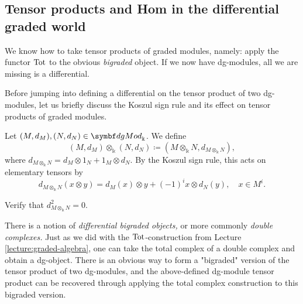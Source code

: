 \subsection{Tensor products and Hom in the differential graded world}
We know how to take tensor products of graded modules, namely: apply the functor \(\operatorname{Tot}\) to the obvious \emph{bigraded} object.
If we now have dg-modules, all we are missing is a differential.
\begin{remark}
	Before jumping into defining a differential on the tensor product of two dg-modules, let us briefly discuss the Koszul sign rule and its
	effect on tensor products of graded modules.
\end{remark}
\begin{definition}
	Let \((M,d_M),(N,d_N)\in\dgMod_\Bbbk\). We define
	\[ (M,d_M) \otimes_\Bbbk (N,d_N) \coloneq (M\otimes_\Bbbk N, d_{M\otimes_\Bbbk N}), \]
	where \(d_{M\otimes_\Bbbk N} = d_M\otimes 1_N + 1_M\otimes d_N\). By the Koszul sign rule, this acts on elementary tensors by
	\[ d_{M\otimes_\Bbbk N}(x\otimes y) = d_M(x)\otimes y + (-1)^i x\otimes d_N(y),\quad x\in M^i. \]
\end{definition}
\begin{exercise}
	Verify that \(d_{M\otimes_\Bbbk N}^2 = 0\).
\end{exercise}
\begin{remark}
	There is a notion of \emph{differential bigraded objects,} or more commonly \emph{double complexes.} Just as we did with the \(\operatorname{Tot}\)-construction
	from Lecture \ref{lecture:graded-algebra}, one can take the total complex of a double complex and obtain a dg-object. There is an obvious way
	to form a "bigraded" version of the tensor product of two dg-modules, and the above-defined dg-module tensor product can be recovered through applying the total
	complex construction to this bigraded version.
\end{remark}